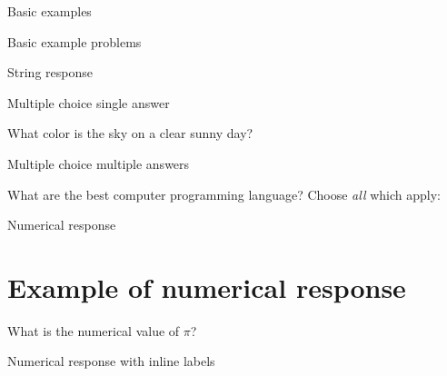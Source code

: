 \begin{edXchapter}{Basic examples}
\begin{edXsequential}{Basic example problems}
\begin{edXvertical}
\begin{edXproblem}{String response}
\begin{edXsolution}
\end{edXsolution}

\end{edXproblem}


\end{edXvertical}


\begin{edXvertical}


\begin{edXproblem}{Multiple choice single answer}{}

What color is the sky on a clear sunny day?


\end{edXproblem}


\begin{edXproblem}{Multiple choice multiple answers}{}

What are the best computer programming language?  Choose {\em all} which apply:


\end{edXproblem}

\end{edXvertical}


\begin{edXvertical}


\begin{edXproblem}{Numerical response}

\section*{Example of numerical response}  

What is the numerical value of $\pi$?


\end{edXproblem}


\begin{edXproblem}{Numerical response with inline labels}{}


\end{edXproblem}
\end{edXvertical}
\end{edXsequential}
\end{edXchapter}
